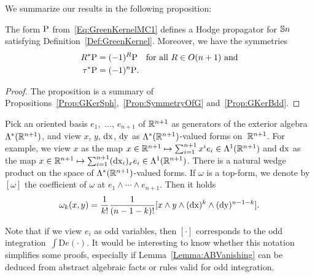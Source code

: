 \documentclass[\MainFolder/Text.tex]{subfiles}
\begin{document}
We summarize our results in the following proposition:

\begin{Proposition}\label{Proposition:GreenKernel}
The form $\mathrm{P}$ from~\eqref{Eq:GreenKernelMC1} defines a Hodge propagator for $\mathbb{S}{n}$ satisfying Definition~\ref{Def:GreenKernel}. Moreover, we have the symmetries
\begin{align*}
R^* \mathrm{P} &= (-1)^R \mathrm{P}\quad \text{for all }R\in O(n+1)\text{ and} \\
\tau^* \mathrm{P} & = (-1)^n \mathrm{P}.
\end{align*}
\end{Proposition}
\begin{proof}
The proposition is a summary of Propositions~\ref{Prop:GKerSph},~\ref{Prop:SymmetryOfG} and~\ref{Prop:GKerBdd}.
\end{proof}

\begin{Remark} \label{Remark:Bryant}
Pick an oriented basis $e_1$,~$ \dotsc$, $e_{n+1}$ of $\mathbb{R}^{n+1}$ as generators of the exterior algebra $\Lambda^*(\mathbb{R}^{n+1})$, and view $x$, $y$, $\operatorname{dx}$, $\operatorname{dy}$ as $\Lambda^*(\mathbb{R}^{n+1})$-valued forms on~$\mathbb{R}^{n+1}$. For example, we view $x$ as the map $x\in \mathbb{R}^{n+1} \mapsto \sum_{i=1}^{n+1} x^i e_i \in \Lambda^1(\mathbb{R}^{n+1})$ and $\operatorname{dx}$ as the map $x\in \mathbb{R}^{n+1} \mapsto \sum_{i=1}^{n+1} (\operatorname{dx}_i)_x e_i \in \Lambda^1(\mathbb{R}^{n+1})$. There is a natural wedge product on the space of $\Lambda^*(\mathbb{R}^{n+1})$-valued forms. If $\omega$ is a top-form, we denote by $[\omega]$ the coefficient of $\omega$ at $e_1 \wedge \dotsm \wedge e_{n+1}$. Then it holds
\[ \omega_k(x,y) = \frac{1}{k!}\frac{1}{(n-1-k)!}[x\wedge y \wedge (\operatorname{dx})^{k} \wedge (\operatorname{dy})^{n-1-k}]. \]

Note that if we view $e_i$ as odd variables, then $[\cdot]$ corresponds to the odd integration~$\int \mathrm{D}e(\cdot)$. It would be interesting to know whether this notation simplifies some proofs, especially if Lemma~\ref{Lemma:ABVanishing} can be deduced from abstract algebraic facts or rules valid for odd integration.
\end{Remark}
\end{document}
